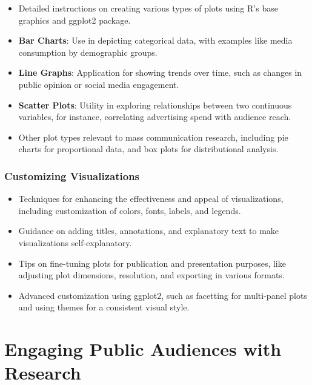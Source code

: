\documentclass[
]{book}
\begin{document}
\begin{itemize}
\item
  Detailed instructions on creating various types of plots using R's base graphics and ggplot2 package.
\item
  \textbf{Bar Charts}: Use in depicting categorical data, with examples like media consumption by demographic groups.
\item
  \textbf{Line Graphs}: Application for showing trends over time, such as changes in public opinion or social media engagement.
\item
  \textbf{Scatter Plots}: Utility in exploring relationships between two continuous variables, for instance, correlating advertising spend with audience reach.
\item
  Other plot types relevant to mass communication research, including pie charts for proportional data, and box plots for distributional analysis.
\end{itemize}

\hypertarget{customizing-visualizations}{%
\subsection*{Customizing Visualizations}\label{customizing-visualizations}}

\begin{itemize}
\item
  Techniques for enhancing the effectiveness and appeal of visualizations, including customization of colors, fonts, labels, and legends.
\item
  Guidance on adding titles, annotations, and explanatory text to make visualizations self-explanatory.
\item
  Tips on fine-tuning plots for publication and presentation purposes, like adjusting plot dimensions, resolution, and exporting in various formats.
\item
  Advanced customization using ggplot2, such as facetting for multi-panel plots and using themes for a consistent visual style.
\end{itemize}

\hypertarget{engaging-public-audiences-with-research}{%
\chapter*{Engaging Public Audiences with Research}\label{engaging-public-audiences-with-research}}
\end{document}
